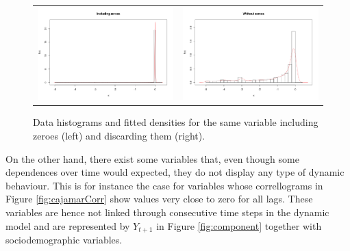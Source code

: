 \begin{figure}[h]
  \centering
    \begin{tabular}{cc}    
       \includegraphics[width=70mm]{figures/with_zeroes}&
       \includegraphics[width=70mm]{figures/without_zeroes}
    \end{tabular}
    \caption{\label{fig:CajamarZeroes}Data histograms and fitted densities for the same variable including zeroes (left) and discarding them (right).}
\end{figure}

On the other hand, there exist some variables that, even though some dependences over time would expected, they do not display any type of dynamic behaviour. This is for instance the case for variables whose correllograms in Figure \ref{fig:cajamarCorr} show values very close to zero for all lags. These variables are hence not linked through consecutive time steps in the dynamic model and are represented by $Y_{t+1}$ in Figure \ref{fig:component} together with sociodemographic variables.


